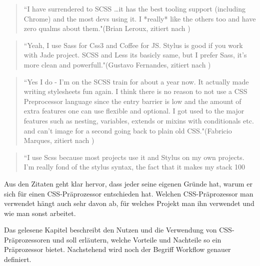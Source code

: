 \begin{quote}
``I have surrendered to SCSS …it has the best tooling support (including Chrome) and the most devs using it. I *really* like the others too and have zero qualms about them."(Brian Leroux, zitiert nach \cite[]{psdtowp.2014})
\end{quote} 
\begin{quote}
``Yeah, I use Sass for Css3 and Coffee for JS. Stylus is good if you work with Jade project. SCSS and Less its basicly same, but I prefer Sass, it's more clean and powerfull."(Gustavo Fernandes, zitiert nach \cite[]{psdtowp.2014})
\end{quote} 
\begin{quote}
``Yes I do - I’m on the SCSS train for about a year now. It actually made writing stylesheets fun again. I think there is no reason to not use a CSS Preprocessor language since the entry barrier is low and the amount of extra features one can use flexible and optional. I got used to the major features such as nesting, variables, extends or mixins with conditionals etc. and can’t image for a second going back to plain old CSS."(Fabricio Marques, zitiert nach \cite[]{psdtowp.2014})
\end{quote} 
\begin{quote}
``I use Scss because most projects use it and Stylus on my own projects. I'm really fond of the stylus syntax, the fact that it makes my stack 100%
\end{quote} 
Aus den Zitaten geht klar hervor, dass jeder seine eigenen Gründe hat, warum er sich für einen CSS-Präprozessor entschieden hat. \newline
Welchen CSS-Präprozessor man verwendet hängt auch sehr davon ab, für welches Projekt man ihn verwendet und wie man sonst arbeitet.\newline

Das gelesene Kapitel beschreibt den Nutzen und die Verwendung von CSS-Präprozessoren und soll erläutern, welche Vorteile und Nachteile so ein Präprozessor bietet. Nachstehend wird noch der Begriff Workflow genauer definiert.
